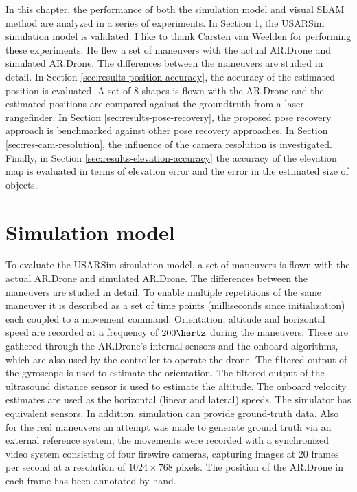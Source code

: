 In this chapter, the performance of both the simulation model and visual SLAM method are analyzed in a series of experiments.
In Section \ref{sec:simulation_results}, the USARSim simulation model is validated.
I like to thank Carsten van Weelden for performing these experiments.
He flew a set of maneuvers with the actual AR.Drone and simulated AR.Drone. The differences between the maneuvers are studied in detail.
In Section \ref{sec:results-position-accuracy}, the accuracy of the estimated position is evaluated.
A set of 8-shapes is flown with the AR.Drone and the estimated positions are compared against the groundtruth from a laser rangefinder.
In Section \ref{sec:results-pose-recovery}, the proposed pose recovery approach is benchmarked against other pose recovery approaches.
In Section \ref{sec:res-cam-resolution}, the influence of the camera resolution is investigated.
Finally, in Section \ref{sec:results-elevation-accuracy} the accuracy of the elevation map is evaluated in terms of elevation error and the error in the estimated size of objects.


	\section{Simulation model}
\label{sec:simulation_results}
To evaluate the USARSim simulation model,  
a set of maneuvers is flown with the actual AR.Drone and
simulated AR.Drone. The differences between the maneuvers are studied in detail. To enable multiple repetitions of the same maneuver it is
described as a set of time points (milliseconds since initialization) each coupled to a movement command.
Orientation, altitude and horizontal speed are recorded at a frequency of $200\hertz$ during the maneuvers. These are gathered through the AR.Drone's internal sensors and the onboard algorithms, which are
also used by the controller to operate the drone. The filtered output of the gyroscope is used
to estimate the orientation. The filtered output of the ultrasound distance sensor is used to estimate
the altitude. The onboard velocity estimates are used as the horizontal (linear
and lateral) speeds. The simulator has equivalent sensors. In addition, simulation can provide ground-truth data. 
Also for the real maneuvers an attempt was made to generate ground truth via an external reference system; the movements were recorded with a synchronized video system consisting of four firewire cameras, capturing images at 20 frames per second at a resolution of $1024 \times 768$ pixels. The position of the AR.Drone 
in each frame has been annotated by hand. 

